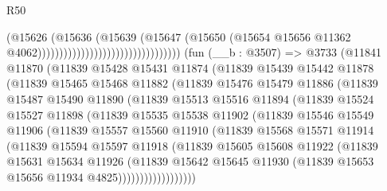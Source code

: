 \begin{lexlean}{R50}
\begin{coremodule}
                                                          (@15626
                                                            (@15636
                                                              (@15639
                                                                (@15647
                                                                  (@15650
                                                                    (@15654
                                                                      @15656
                                                                      @11362
                                                                      @4062)))))))))))))))))))))))))))))))))
    (fun (__b : @3507) =>
    @3733
      (@11841
        @11870
        (@11839
          @15428
          @15431
          @11874
          (@11839
            @15439
            @15442
            @11878
            (@11839
              @15465
              @15468
              @11882
              (@11839
                @15476
                @15479
                @11886
                (@11839
                  @15487
                  @15490
                  @11890
                  (@11839
                    @15513
                    @15516
                    @11894
                    (@11839
                      @15524
                      @15527
                      @11898
                      (@11839
                        @15535
                        @15538
                        @11902
                        (@11839
                          @15546
                          @15549
                          @11906
                          (@11839
                            @15557
                            @15560
                            @11910
                            (@11839
                              @15568
                              @15571
                              @11914
                              (@11839
                                @15594
                                @15597
                                @11918
                                (@11839
                                  @15605
                                  @15608
                                  @11922
                                  (@11839
                                    @15631
                                    @15634
                                    @11926
                                    (@11839
                                      @15642
                                      @15645
                                      @11930
                                      (@11839 @15653 @15656 @11934 @4825))))))))))))))))))

\end{coremodule}
\end{lexlean}
